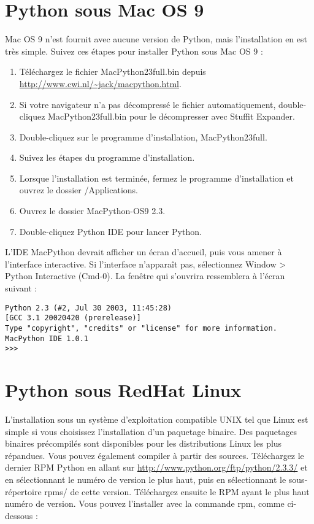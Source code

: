 \section{Python sous Mac OS 9}\label{Python sous Mac OS 9}

Mac OS 9 n'est fournit avec aucune version de Python, mais l'installation en est très simple. Suivez ces étapes pour installer Python sous Mac OS 9 :

\begin{enumerate}
    \item{Téléchargez le fichier MacPython23full.bin depuis \url{http://www.cwi.nl/~jack/macpython.html}.}
    \item{Si votre navigateur n'a pas décompressé le fichier automatiquement, double-cliquez MacPython23full.bin pour le décompresser avec Stuffit Expander.}
    \item{Double-cliquez sur le programme d'installation, MacPython23full.}
    \item{Suivez les étapes du programme d'installation.}
    \item{Lorsque l'installation est terminée, fermez le programme d'installation et  ouvrez le dossier /Applications.}
    \item{Ouvrez le dossier MacPython-OS9 2.3.}
    \item{Double-cliquez Python IDE pour lancer Python.}
\end{enumerate}

\medskip
L'IDE MacPython devrait afficher un écran d'accueil, puis vous amener à l'interface interactive. Si l'interface n'apparaît pas, sélectionnez Window > Python Interactive (Cmd-0). La fenêtre qui s'ouvrira ressemblera à l'écran suivant :

\begin{lstlisting}
Python 2.3 (#2, Jul 30 2003, 11:45:28)
[GCC 3.1 20020420 (prerelease)]
Type "copyright", "credits" or "license" for more information.
MacPython IDE 1.0.1
>>>
\end{lstlisting}

\section{Python sous RedHat Linux}\label{Python sous RedHat Linux}

L'installation sous un système d'exploitation compatible UNIX tel que Linux est simple si vous choisissez l'installation d'un paquetage binaire. Des paquetages binaires précompilés sont disponibles pour les distributions Linux les plus répandues. Vous pouvez également compiler à partir des sources.
Téléchargez le dernier RPM Python en allant sur \url{http://www.python.org/ftp/python/2.3.3/} et en sélectionnant le numéro de version le plus haut, puis en sélectionnant le sous-répertoire rpms/ de cette version. Téléchargez ensuite le RPM ayant le plus haut numéro de version. Vous pouvez l'installer avec la commande rpm, comme ci-dessous :

